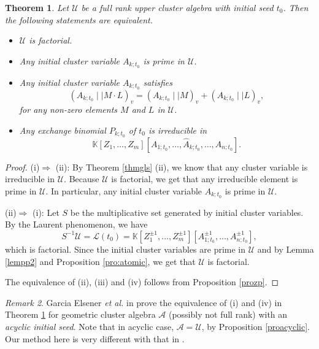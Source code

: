 \documentclass{amsart}
\newtheorem{theorem}{Theorem}[section]
\theoremstyle{definition}
\theoremstyle{remark}
\newtheorem{remark}[theorem]{Remark}
\numberwithin{equation}{section}
\begin{document}
\begin{theorem}\label{thmcufd}
Let $\mathcal U$ be a full rank upper cluster algebra with initial seed $t_0$. Then the following statements are equivalent.
\begin{itemize}
\item[(i)] $\mathcal U$ is factorial.
 \item[(ii)] Any initial  cluster variable  $A_{k;t_0}$ is prime in $\mathcal U$.
\item[(iii)] Any initial cluster variable $A_{k;t_0}$  satisfies
$$(A_{k;t_0}\mid\mid M\cdot L)_v=(A_{k;t_0}\mid\mid M)_v+(A_{k;t_0}\mid\mid L)_v,$$
for any non-zero elements $M$ and $L$ in $\mathcal U$.
\item[(iv)]  Any exchange binomial $P_{k;t_0}$ of $t_0$ is irreducible in $$\mathbb K[Z_1,\ldots,Z_m][A_{1;t_0},\ldots,\widehat A_{k;t_0},\ldots,A_{n;t_0}].$$
\end{itemize}
\end{theorem}
\begin{proof}

(i)$\Longrightarrow$ (ii): By Theorem \ref{thmgls} (ii), we know that any cluster variable is irreducible in $\mathcal U$. Because $\mathcal U$ is factorial, we get that any irreducible element is prime in $\mathcal U$. In particular, any initial  cluster variable  $A_{k;t_0}$ is prime in $\mathcal U$.

(ii)$\Longrightarrow$ (i): Let $S$ be the  multiplicative set generated by initial cluster variables. By the Laurent phenomenon, we have $$S^{-1}\mathcal U=\mathcal L(t_0)=\mathbb K[Z_1^{\pm1},\ldots,Z_m^{\pm1}][A_{1;t_0}^{\pm1},\ldots,A_{n;t_0}^{\pm1}],$$
which is factorial.
Since the initial cluster variables are prime in $\mathcal U$ and by Lemma \ref{lempp2} and Proposition \ref{pro:atomic}, we get that $\mathcal U$ is factorial.

The equivalence of (ii), (iii) and (iv) follows from Proposition \ref{prozp}.
\end{proof}

\begin{remark}
Garcia Elsener {\em et al.} in \cite[Theorem 5.1]{GLS19} prove the equivalence of (i) and (iv) in Theorem \ref{thmcufd} for  geometric cluster algebra $\mathcal A$ (possibly not full rank) with an {\em acyclic initial seed}.  Note that in acyclic case, $\mathcal A=\mathcal U$, by Proposition \ref{proacyclic}. Our method here is very different with that in \cite{GLS19}.
\end{remark}
\end{document}

